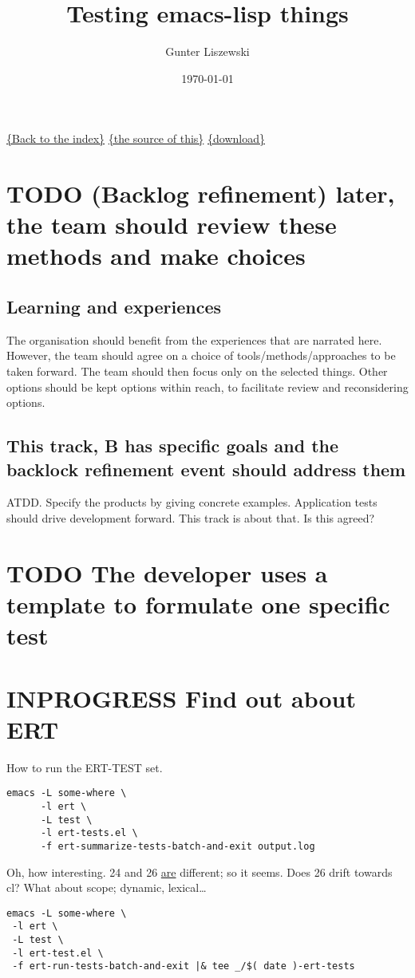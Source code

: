 \documentclass[11pt]{article}
\author{Gunter Liszewski}
\date{\today}
\title{Testing emacs-lisp things}
\begin{document}
\maketitle
\tableofcontents

\href{../a/index.org}{\{Back to the index\}} \href{./test-this.org.html}{\{the source of this\}} \href{https://www2.bteco.ltd.uk/t/6/b/test-this.org}{\{download\}}

\section*{{\bfseries\sffamily TODO} (Backlog refinement) later, the team should review these methods and make choices}
\label{sec:org9b635f1}
\subsection*{Learning and experiences}
\label{sec:org55a440d}
The organisation should benefit from the experiences that are narrated here.
However, the team should agree on a choice of tools/methods/approaches to be
taken forward. The team should then focus only on the selected things. Other
options should be kept options within reach, to facilitate review and reconsidering
options.
\subsection*{This track, B has specific goals and the backlock refinement event should address them}
\label{sec:orgccee0b4}
ATDD. Specify the products by giving concrete examples. Application tests should
drive development forward. This track is about that. Is this agreed?
\section*{{\bfseries\sffamily TODO} The developer uses a template to formulate one specific test}
\label{sec:org45cfb33}
\section*{{\bfseries\sffamily INPROGRESS} Find out about ERT}
\label{sec:org8b5d9ee}
How to run the ERT-TEST set.

\begin{verbatim}
emacs -L some-where \
      -l ert \
      -L test \
      -l ert-tests.el \
      -f ert-summarize-tests-batch-and-exit output.log
\end{verbatim}


Oh, how interesting. 24 and 26 \uline{are} different; so it seems.
Does 26 drift towards cl? What about scope; dynamic, lexical\ldots{}
\begin{verbatim}
emacs -L some-where \
 -l ert \
 -L test \
 -l ert-test.el \
 -f ert-run-tests-batch-and-exit |& tee _/$( date )-ert-tests
\end{verbatim}
\end{document}

